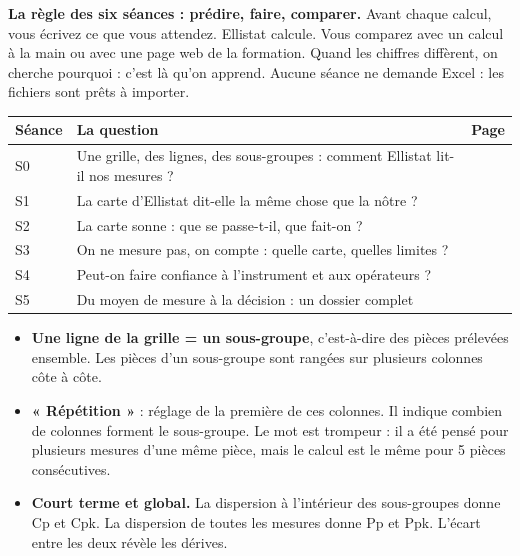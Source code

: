 \documentclass[10pt,a4paper]{article}
\begin{document}
\thispagestyle{fancy}

\begin{tcolorbox}[boite]
\textbf{La règle des six séances : prédire, faire, comparer.} Avant chaque calcul, vous écrivez ce que vous attendez. Ellistat calcule. Vous comparez avec un calcul à la main ou avec une page web de la formation. Quand les chiffres diffèrent, on cherche pourquoi : c'est là qu'on apprend. Aucune séance ne demande Excel : les fichiers sont prêts à importer.
\end{tcolorbox}

\renewcommand{\arraystretch}{1.25}
\begin{tabularx}{\linewidth}{@{}l X l@{}}
\toprule
\textbf{Séance} & \textbf{La question} & \textbf{Page}\\\midrule
S0 & Une grille, des lignes, des sous-groupes : comment Ellistat lit-il nos mesures ? & \pageref{s0}\\
S1 & La carte d'Ellistat dit-elle la même chose que la nôtre ? & \pageref{s1}\\
S2 & La carte sonne : que se passe-t-il, que fait-on ? & \pageref{s2}\\
S3 & On ne mesure pas, on compte : quelle carte, quelles limites ? & \pageref{s3}\\
S4 & Peut-on faire confiance à l'instrument et aux opérateurs ? & \pageref{s4}\\
S5 & Du moyen de mesure à la décision : un dossier complet & \pageref{s5}\\
\bottomrule
\end{tabularx}

\begin{itemize}
\item \textbf{Une ligne de la grille = un sous-groupe}, c'est-à-dire des pièces prélevées ensemble. Les pièces d'un sous-groupe sont rangées sur plusieurs colonnes côte à côte.
\item \textbf{« Répétition »} : réglage de la première de ces colonnes. Il indique combien de colonnes forment le sous-groupe. Le mot est trompeur : il a été pensé pour plusieurs mesures d'une même pièce, mais le calcul est le même pour 5 pièces consécutives.
\item \textbf{Court terme et global.} La dispersion à l'intérieur des sous-groupes donne Cp et Cpk. La dispersion de toutes les mesures donne Pp et Ppk. L'écart entre les deux révèle les dérives.
\end{itemize}
\end{document}
